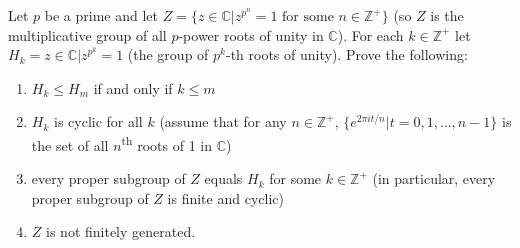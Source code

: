 \begin{exercise}
    Let $p$ be a prime and let $Z = \{z\in\mathbb{C} | z^{p^n}=1 \text{ for some } n\in \mathbb{Z}^+\}$ (so $Z$ is the multiplicative group of all $p$-power roots of unity in $\mathbb{C}$). For each $k \in \mathbb{Z}^+$ let $H_k = z\in\mathbb{C} | z^{p^k}=1$ (the group of $p^k$-th roots of unity). Prove the following:
    \begin{enumerate}[label = \textbf{(\alph*)}]
        \item $H_k \leq H_m$ if and only if $k \leq m$
        \item $H_k$ is cyclic for all $k$ (assume that for any $n \in \mathbb{Z}^+$, $\{e^{2\pi it/n} | t = 0,1,\dots , n-1\}$ is the set of all $n$\textsuperscript{th} roots of 1 in $\mathbb{C}$)
        \item every proper subgroup of $Z$ equals $H_k$ for some $k \in \mathbb{Z}^+$ (in particular, every proper subgroup of $Z$ is finite and cyclic)
        \item $Z$ is not finitely generated. \\
    \end{enumerate}
\end{exercise}

